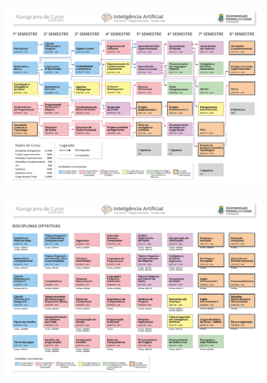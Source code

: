 \label{an:fluxograma}

\begin{center}
  \includegraphics[height=0.99\textwidth,angle=90]{"Fluxograma IA - 2025-01.jpg"}
\end{center}

\begin{center}
  \includegraphics[height=0.99\textwidth,angle=90]{"Fluxograma IA - 2025-02.jpg"}
\end{center}

